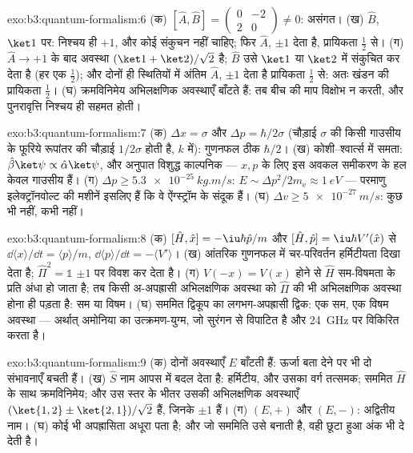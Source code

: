 \begin{solution}{exo:b3:quantum-formalism:6}
(क) $[\hat A, \hat B] = \begin{pmatrix}0 & -2\\ 2 & 0\end{pmatrix}
\neq 0$: असंगत। (ख) $\hat B$, $\ket1$ पर: निश्चय ही $+1$, और कोई
संकुचन नहीं चाहिए; फिर $\hat A$, $\pm1$ देता है, प्रायिकता
$\tfrac12$ से। (ग) $\hat A \to +1$ के बाद अवस्था
$(\ket1 + \ket2)/\sqrt2$ है; $\hat B$ उसे $\ket1$ या
$\ket2$ में संकुचित कर देता है (हर एक $\tfrac12$); और दोनों ही स्थितियों में
अंतिम $\hat A$, $\pm1$ देता है प्रायिकता $\tfrac12$ से: अतः खंडन की
प्रायिकता $\tfrac12$। (घ) क्रमविनिमेय  अभिलक्षणिक अवस्थाएँ
बाँटते हैं: तब बीच की माप विक्षोभ न करती, और पुनरावृत्ति निश्चय ही
सहमत होती।
\end{solution}

\begin{solution}{exo:b3:quantum-formalism:7}
(क) $\Delta x = \sigma$ और $\Delta p = \hbar/2\sigma$ (चौड़ाई
$\sigma$ की किसी गाउसीय के फूरिये रूपांतर की चौड़ाई
$1/2\sigma$ होती है, $k$ में): गुणनफल ठीक $\hbar/2$। (ख) कोशी--श्वार्त्स में समता:
$\hat\beta\ket\psi \propto \hat\alpha\ket\psi$, और अनुपात विशुद्ध
काल्पनिक --- $x, p$ के लिए इस अवकल समीकरण के हल केवल गाउसीय हैं।
(ग) $\Delta p \ge \qty{5.3e-25}{kg.m/s}$: $E \sim
\Delta p^2/2m_{\text{e}} \approx \qty{1}{eV}$ --- परमाणु
इलेक्ट्रॉनवोल्ट की मशीनें इसलिए हैं कि वे ऐंग्स्ट्रॉम के संदूक हैं। (घ)
$\Delta v \ge \qty{5e-27}{m/s}$: कुछ भी नहीं, कभी नहीं।
\end{solution}

\begin{solution}{exo:b3:quantum-formalism:8}
(क) $[\hat H, \hat x] = -\iu\hbar\hat p/m$ और $[\hat H, \hat p] =
\iu\hbar V'(\hat x)$ से $\dd\langle x\rangle/\dd t = \langle
p\rangle/m$, $\dd\langle p\rangle/\dd t = -\langle V'\rangle$। (ख)
आंतरिक गुणनफल में चर-परिवर्तन हर्मिटीयता दिखा देता है;
$\hat\Pi^2 = \mathbb 1$  $\pm1$ पर विवश कर देता है। (ग) $V(-x) =
V(x)$ होने से $\hat H$ सम-विषमता के प्रति अंधा हो जाता है; तब किसी
अ-अपह्रासी अभिलक्षणिक अवस्था को $\hat\Pi$ की भी अभिलक्षणिक अवस्था होना
ही पड़ता है: सम या विषम। (घ) सममित द्विकूप का लगभग-अपह्रासी द्विक:
एक सम, एक विषम अवस्था --- अर्थात् अमोनिया का उत्क्रमण-युग्म, जो सुरंगन
से विपाटित है और \qty{24}{GHz} पर विकिरित करता है।
\end{solution}

\begin{solution}{exo:b3:quantum-formalism:9}
(क) दोनों अवस्थाएँ $E$ बाँटती हैं: ऊर्जा बता देने पर भी दो
संभावनाएँ बचती हैं। (ख) $\hat S$ नाम आपस में बदल देता है: हर्मिटीय, और
उसका वर्ग तत्समक; सममित $\hat H$ के साथ क्रमविनिमेय; और उस स्तर के भीतर उसकी
अभिलक्षणिक अवस्थाएँ $(\ket{1,2} \pm \ket{2,1})/\sqrt2$ हैं, जिनके
 $\pm1$ हैं। (ग) $(E, +)$ और $(E, -)$: अद्वितीय नाम। (घ)
कोई भी अपह्रासिता अधूरा पता है; और जो सममिति उसे बनाती है, वही छूटा हुआ
अंक भी दे देती है।
\end{solution}

